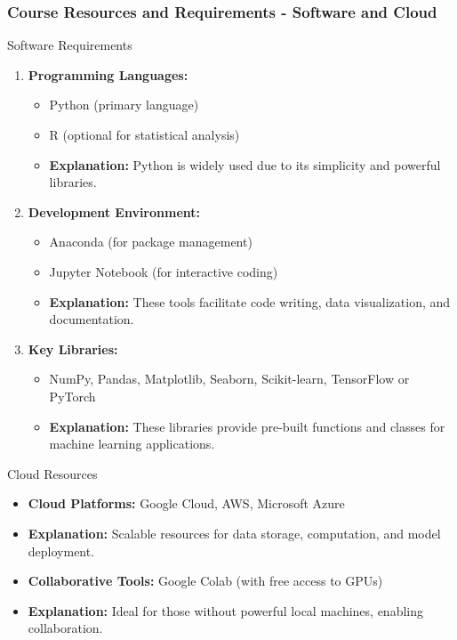 \documentclass[aspectratio=169]{beamer}
\begin{document}
\begin{frame}[fragile]
    \frametitle{Course Resources and Requirements - Software and Cloud}
    \begin{block}{Software Requirements}
        \begin{enumerate}
            \item \textbf{Programming Languages:}
                \begin{itemize}
                    \item Python (primary language)
                    \item R (optional for statistical analysis)
                    \item \textbf{Explanation:} Python is widely used due to its simplicity and powerful libraries.
                \end{itemize}
                
            \item \textbf{Development Environment:}
                \begin{itemize}
                    \item Anaconda (for package management)
                    \item Jupyter Notebook (for interactive coding)
                    \item \textbf{Explanation:} These tools facilitate code writing, data visualization, and documentation.
                \end{itemize}

            \item \textbf{Key Libraries:}
                \begin{itemize}
                    \item NumPy, Pandas, Matplotlib, Seaborn, Scikit-learn, TensorFlow or PyTorch
                    \item \textbf{Explanation:} These libraries provide pre-built functions and classes for machine learning applications.
                \end{itemize}
        \end{enumerate}
    \end{block}

    \begin{block}{Cloud Resources}
        \begin{itemize}
            \item \textbf{Cloud Platforms:} Google Cloud, AWS, Microsoft Azure
            \item \textbf{Explanation:} Scalable resources for data storage, computation, and model deployment.
            \item \textbf{Collaborative Tools:} Google Colab (with free access to GPUs)
            \item \textbf{Explanation:} Ideal for those without powerful local machines, enabling collaboration.
        \end{itemize}
    \end{block}
\end{frame}
\end{document}
